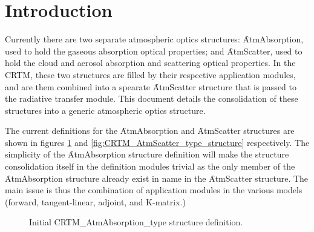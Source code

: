 \section{Introduction}

Currently there are two separate atmospheric optics structures: \f{AtmAbsorption}, used to hold the gaseous absorption optical properties; and \f{AtmScatter}, used to hold the cloud and aerosol absorption and scattering optical properties. In the CRTM, these two structures are filled by their respective application modules, and are them combined into a spearate \f{AtmScatter} structure that is passed to the radiative transfer module. This document details the consolidation of these structures into a generic atmospheric optics structure.

The current definitions for the \f{AtmAbsorption} and \f{AtmScatter} structures are shown in figures \ref{fig:CRTM_AtmAbsorption_type_structure} and \ref{fig:CRTM_AtmScatter_type_structure} respectively. The simplicity of the \f{AtmAbsorption} structure definition will make the structure consolidation itself in the definition modules trivial as the only member of the \f{AtmAbsorption} structure already exist in name in the \f{AtmScatter} structure. The main issue is thus the combination of application modules in the various models (forward, tangent-linear, adjoint, and K-matrix.)

\begin{figure}[htp]
  \centering
  \caption{Initial CRTM\_AtmAbsorption\_type structure definition.}
  \label{fig:CRTM_AtmAbsorption_type_structure}
\end{figure}


